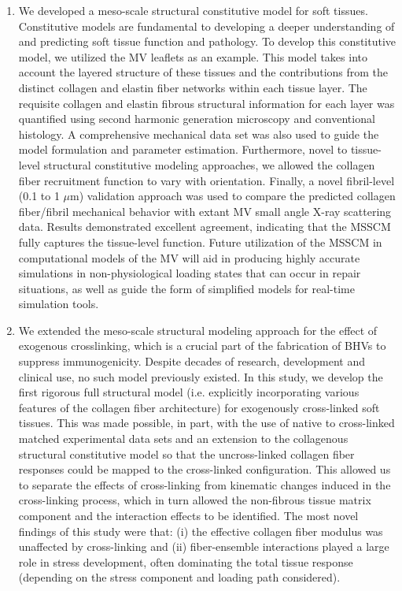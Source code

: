     \begin{enumerate}
        \item We developed a meso-scale structural constitutive model for soft tissues. Constitutive models are fundamental to developing a deeper understanding of and predicting soft tissue function and pathology. To develop this constitutive model, we utilized the MV leaflets as an example. This model takes into account the layered structure of these tissues and the contributions from the distinct collagen and elastin fiber networks within each tissue layer. The requisite collagen and elastin fibrous structural information for each layer was quantified using second harmonic generation microscopy and conventional histology. A comprehensive mechanical data set was also used to guide the model formulation and parameter estimation. Furthermore, novel to tissue-level structural constitutive modeling approaches, we allowed the collagen fiber recruitment function to vary with orientation. Finally, a novel fibril-level (0.1 to 1 $\mu$m) validation approach was used to compare the predicted collagen fiber/fibril mechanical behavior with extant MV small angle X-ray scattering data. Results demonstrated excellent agreement, indicating that the MSSCM fully captures the tissue-level function. Future utilization of the MSSCM in computational models of the MV will aid in producing highly accurate simulations in non-physiological loading states that can occur in repair situations, as well as guide the form of simplified models for real-time simulation tools.
        \item We extended the meso-scale structural modeling approach for the effect of exogenous crosslinking, which is a crucial part of the fabrication of BHVs to suppress immunogenicity. Despite decades of research, development and clinical use, no such model previously existed. In this study, we develop the first rigorous full structural model (i.e. explicitly incorporating various features of the collagen fiber architecture) for exogenously cross-linked soft tissues. This was made possible, in part, with the use of native to cross-linked matched experimental data sets and an extension to the collagenous structural constitutive model so that the uncross-linked collagen fiber responses could be mapped to the cross-linked configuration. This allowed us to separate the effects of cross-linking from kinematic changes induced in the cross-linking process, which in turn allowed the non-fibrous tissue matrix component and the interaction effects to be identified.  The most novel findings of this study were that: (i) the effective collagen fiber modulus was unaffected by cross-linking and (ii) fiber-ensemble interactions played a large role in stress development, often dominating the total tissue response (depending on the stress component and loading path considered).

\end{enumerate}
